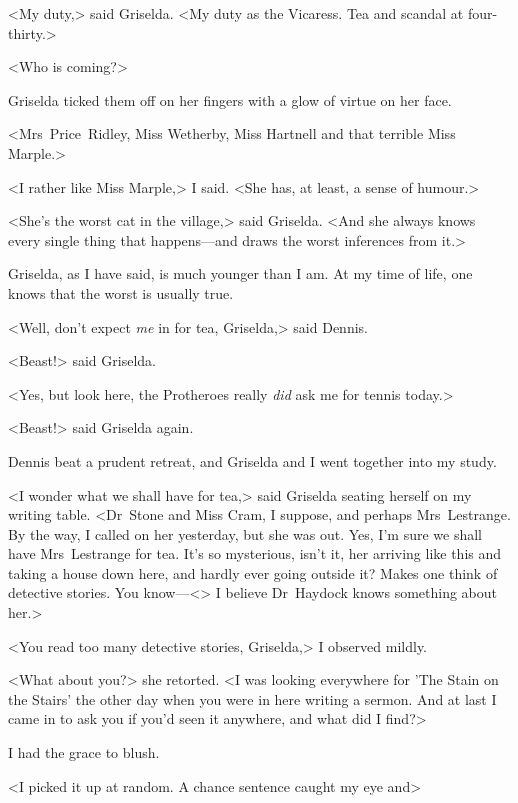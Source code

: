 <My duty,> said Griselda. <My duty as the Vicaress. Tea and scandal at four-thirty.>

<Who is coming?>

Griselda ticked them off on her fingers with a glow of virtue on her face.

<Mrs~Price~Ridley, Miss Wetherby, Miss Hartnell and that terrible Miss Marple.>

<I rather like Miss Marple,> I said. <She has, at least, a sense of humour.>

<She's the worst cat in the village,> said Griselda. <And she always knows every single thing that happens—and draws the worst inferences from it.>

Griselda, as I have said, is much younger than I am. At my time of life, one knows that the worst is usually true.

<Well, don't expect \emph{me} in for tea, Griselda,> said Dennis.

<Beast!> said Griselda.

<Yes, but look here, the Protheroes really \emph{did} ask me for tennis today.>

<Beast!> said Griselda again.

Dennis beat a prudent retreat, and Griselda and I went together into my study.

<I wonder what we shall have for tea,> said Griselda seating herself on my writing table. <Dr~Stone and Miss Cram, I suppose, and perhaps Mrs~Lestrange. By the way, I called on her yesterday, but she was out. Yes, I'm sure we shall have Mrs~Lestrange for tea. It's so mysterious, isn't it, her arriving like this and taking a house down here, and hardly ever going outside it? Makes one think of detective stories. You know—<> I believe Dr~Haydock knows something about her.>

<You read too many detective stories, Griselda,> I observed mildly.

<What about you?> she retorted. <I was looking everywhere for 'The Stain on the Stairs' the other day when you were in here writing a sermon. And at last I came in to ask you if you'd seen it anywhere, and what did I find?>

I had the grace to blush.

<I picked it up at random. A chance sentence caught my eye and\longdash>

